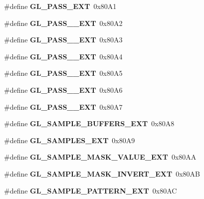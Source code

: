 \begin{DoxyCompactItemize}
\item 
\#define {\bfseries G\+L\+\_\+P\+A\+S\+S\+\_\+\+E\+X\+T}~0x80\+A1\label{_s_d_l__opengl_8h_aa579dedc63b8774f6162377800d97d06}

\item 
\#define {\bfseries G\+L\+\_\+P\+A\+S\+S\+\_\+\_\+\+E\+X\+T}~0x80\+A2\label{_s_d_l__opengl_8h_a8df9dfff1fd2f53863893c47d16af196}

\item 
\#define {\bfseries G\+L\+\_\+P\+A\+S\+S\+\_\+\_\+\+E\+X\+T}~0x80\+A3\label{_s_d_l__opengl_8h_a9b9ba9560380508a49f859b1b033313e}

\item 
\#define {\bfseries G\+L\+\_\+P\+A\+S\+S\+\_\+\_\+\+E\+X\+T}~0x80\+A4\label{_s_d_l__opengl_8h_a20711395009e86daa01f3ec50cb72764}

\item 
\#define {\bfseries G\+L\+\_\+P\+A\+S\+S\+\_\+\_\+\+E\+X\+T}~0x80\+A5\label{_s_d_l__opengl_8h_af4d9dedcdbc8dd19a33895a52afcd5de}

\item 
\#define {\bfseries G\+L\+\_\+P\+A\+S\+S\+\_\+\_\+\+E\+X\+T}~0x80\+A6\label{_s_d_l__opengl_8h_aea683ca5e3311bede30a33e8266c2774}

\item 
\#define {\bfseries G\+L\+\_\+P\+A\+S\+S\+\_\+\_\+\+E\+X\+T}~0x80\+A7\label{_s_d_l__opengl_8h_a12d7dd926ddb67cf6a7f2389fb01a8a6}

\item 
\#define {\bfseries G\+L\+\_\+\+S\+A\+M\+P\+L\+E\+\_\+\+B\+U\+F\+F\+E\+R\+S\+\_\+\+E\+X\+T}~0x80\+A8\label{_s_d_l__opengl_8h_a944f45feabb4567c7e05c35ad06ef77e}

\item 
\#define {\bfseries G\+L\+\_\+\+S\+A\+M\+P\+L\+E\+S\+\_\+\+E\+X\+T}~0x80\+A9\label{_s_d_l__opengl_8h_ac644054dc5173480a8a55dd2755518fd}

\item 
\#define {\bfseries G\+L\+\_\+\+S\+A\+M\+P\+L\+E\+\_\+\+M\+A\+S\+K\+\_\+\+V\+A\+L\+U\+E\+\_\+\+E\+X\+T}~0x80\+A\+A\label{_s_d_l__opengl_8h_a092a15600541f2e635852718f68cf55e}

\item 
\#define {\bfseries G\+L\+\_\+\+S\+A\+M\+P\+L\+E\+\_\+\+M\+A\+S\+K\+\_\+\+I\+N\+V\+E\+R\+T\+\_\+\+E\+X\+T}~0x80\+A\+B\label{_s_d_l__opengl_8h_a5c334203a60c5e7b4331eb27ded36342}

\item 
\#define {\bfseries G\+L\+\_\+\+S\+A\+M\+P\+L\+E\+\_\+\+P\+A\+T\+T\+E\+R\+N\+\_\+\+E\+X\+T}~0x80\+A\+C\label{_s_d_l__opengl_8h_a87db3795f4978cda31f3687e86526c93}


\end{DoxyCompactItemize}

